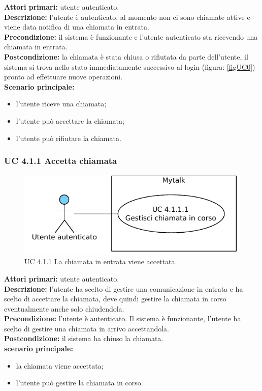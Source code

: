 \noindent
\textbf{Attori primari:} utente autenticato.\\
\textbf{Descrizione:} l'utente è autenticato, al momento non ci sono chiamate attive e viene data notifica di una chiamata in entrata.\\
\textbf{Precondizione:} il sistema è funzionante e l'utente autenticato sta ricevendo una chiamata in entrata.\\
\textbf{Postcondizione:} la chiamata è stata chiusa o rifiutata da parte dell'utente, il sistema si trova nello stato immediatamente successivo al login (figura: \ref{figUC0}) pronto ad effettuare nuove operazioni.\\
\textbf{Scenario principale:}
\begin{itemize}
\item l'utente riceve una chiamata;
\item l'utente può accettare la chiamata;
\item l'utente può rifiutare la chiamata.
\end{itemize}

\subsubsection{UC 4.1.1 Accetta chiamata}

\begin{figure}[htbp]
\centering
\includegraphics[scale=0.7]{./casi_uso/UC4-1-1.pdf}
\caption{UC 4.1.1 La chiamata in entrata viene accettata.}
\end{figure}

\noindent\textbf{Attori primari:} utente autenticato.\\
\textbf{Descrizione:} l'utente ha scelto di gestire una comunicazione in entrata e ha scelto di accettare la chiamata, deve quindi gestire la chiamata in corso eventualmente anche solo chiudendola.\\
\textbf{Precondizione:} l'utente è autenticato. Il sistema è funzionante, l'utente ha scelto di gestire una chiamata in arrivo accettandola.\\
\textbf{Postcondizione:} il sistema ha chiuso la chiamata.\\
\textbf{scenario principale:}
\begin{itemize}
\item la chiamata viene accettata;
\item l'utente può gestire la chiamata in corso.
\end{itemize}

